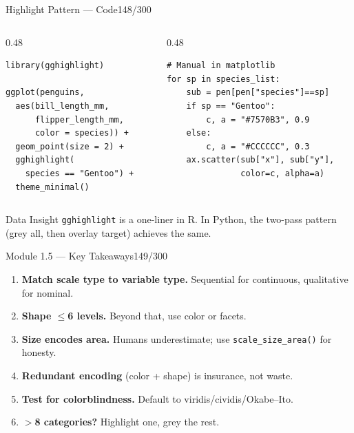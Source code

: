\documentclass[10pt]{beamer}
\newcommand{\smark}[1]{\hfill{\scriptsize\color{codegray}#1}}
\begin{document}
\begin{frame}[fragile]{Highlight Pattern --- Code}\smark{148/300}
\begin{columns}[T]
\begin{column}{0.48\textwidth}
\begin{lstlisting}[style=Rstyle]
library(gghighlight)

ggplot(penguins,
  aes(bill_length_mm,
      flipper_length_mm,
      color = species)) +
  geom_point(size = 2) +
  gghighlight(
    species == "Gentoo") +
  theme_minimal()
\end{lstlisting}
\end{column}
\begin{column}{0.48\textwidth}
\begin{lstlisting}[style=Pystyle]
# Manual in matplotlib
for sp in species_list:
    sub = pen[pen["species"]==sp]
    if sp == "Gentoo":
        c, a = "#7570B3", 0.9
    else:
        c, a = "#CCCCCC", 0.3
    ax.scatter(sub["x"], sub["y"],
               color=c, alpha=a)
\end{lstlisting}
\end{column}
\end{columns}
\vspace{0.2cm}
\begin{exampleblock}{Data Insight}
    \scriptsize \texttt{gghighlight} is a one-liner in R. In Python, the two-pass pattern (grey all, then overlay target) achieves the same.
\end{exampleblock}
\end{frame}

\begin{frame}{Module 1.5 --- Key Takeaways}\smark{149/300}
\begin{enumerate}
    \item \textbf{Match scale type to variable type.} Sequential for continuous, qualitative for nominal.
    \item \textbf{Shape $\leq$6 levels.} Beyond that, use color or facets.
    \item \textbf{Size encodes area.} Humans underestimate; use \texttt{scale\_size\_area()} for honesty.
    \item \textbf{Redundant encoding} (color + shape) is insurance, not waste.
    \item \textbf{Test for colorblindness.} Default to viridis/cividis/Okabe--Ito.
    \item \textbf{$>$8 categories?} Highlight one, grey the rest.
\end{enumerate}
\end{frame}
\end{document}
